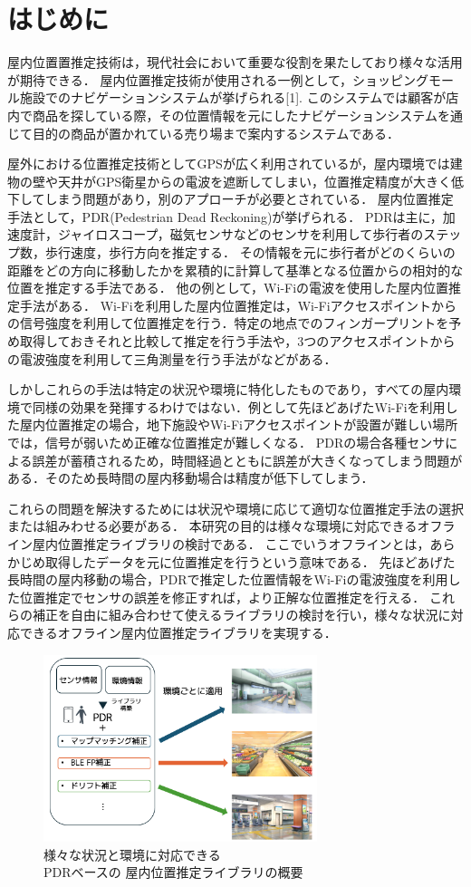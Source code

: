 
\section{はじめに}
屋内位置置推定技術は，現代社会において重要な役割を果たしており様々な活用が期待できる．
屋内位置推定技術が使用される一例として，ショッピングモール施設でのナビゲーションシステムが挙げられる[1].
このシステムでは顧客が店内で商品を探している際，その位置情報を元にしたナビゲーションシステムを通じて目的の商品が置かれている売り場まで案内するシステムである．

屋外における位置推定技術としてGPSが広く利用されているが，屋内環境では建物の壁や天井がGPS衛星からの電波を遮断してしまい，位置推定精度が大きく低下してしまう問題があり，別のアプローチが必要とされている．
屋内位置推定手法として，PDR(Pedestrian Dead Reckoning)が挙げられる．
PDRは主に，加速度計，ジャイロスコープ，磁気センサなどのセンサを利用して歩行者のステップ数，歩行速度，歩行方向を推定する．
その情報を元に歩行者がどのくらいの距離をどの方向に移動したかを累積的に計算して基準となる位置からの相対的な位置を推定する手法である．
他の例として，Wi-Fiの電波を使用した屋内位置推定手法がある．
Wi-Fiを利用した屋内位置推定は，Wi-Fiアクセスポイントからの信号強度を利用して位置推定を行う．特定の地点でのフィンガープリントを予め取得しておきそれと比較して推定を行う手法や，3つのアクセスポイントからの電波強度を利用して三角測量を行う手法がなどがある．

しかしこれらの手法は特定の状況や環境に特化したものであり，すべての屋内環境で同様の効果を発揮するわけではない．例として先ほどあげたWi-Fiを利用した屋内位置推定の場合，地下施設やWi-Fiアクセスポイントが設置が難しい場所では，信号が弱いため正確な位置推定が難しくなる．
PDRの場合各種センサによる誤差が蓄積されるため，時間経過とともに誤差が大きくなってしまう問題がある．そのため長時間の屋内移動場合は精度が低下してしまう．

これらの問題を解決するためには状況や環境に応じて適切な位置推定手法の選択または組みわせる必要がある．
本研究の目的は様々な環境に対応できるオフライン屋内位置推定ライブラリの検討である．
ここでいうオフラインとは，あらかじめ取得したデータを元に位置推定を行うという意味である．
先ほどあげた長時間の屋内移動の場合，PDRで推定した位置情報をWi-Fiの電波強度を利用した位置推定でセンサの誤差を修正すれば，より正解な位置推定を行える．
これらの補正を自由に組み合わせて使えるライブラリの検討を行い，様々な状況に対応できるオフライン屋内位置推定ライブラリを実現する．

\begin{figure}[h]
	\centering
	\includegraphics[width=80mm]{image/first.png}
	\caption{様々な状況と環境に対応できる\\PDRベースの
		屋内位置推定ライブラリの概要}    \label{fig:gt-trajectory}
\end{figure}
